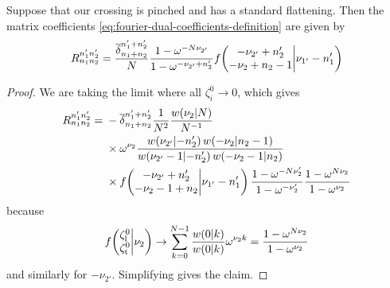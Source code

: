 \documentclass{sl2ams}
\numberwithin{equation}{section}
\begin{document}
\begin{lemma}
  \label{thm:fourier-dual-lemma-pinched}
  Suppose that our crossing is pinched and has a standard flattening.
  Then the matrix coefficients \eqref{eq:fourier-dual-coefficients-definition} are given by 
  \begin{equation}
    \label{eq:fourier-dual-coefficients-pinched}
    R_{n_{1} n_{2}}^{n_{1}' n_{2}'}
    =
    \frac{
      \overline{\delta}_{n_1 + n_2}^{n_1' +  n_2'}
      }{
      N 
    }
    \frac{
      1- \omega^{-N \nu_{2'}}
      }{
      1- \omega^{-\nu_{2'} + n_{2}'}
    }
    f\mathopen{}\left( \begin{matrix} - \nu_{2'} + n_{2}'  \\ - \nu_{2} + n_{2} - 1 \end{matrix}\middle| \nu_{1'} - n_{1}'  \right)
  \end{equation}
\end{lemma}

\begin{proof}
  We are taking the limit where all \(\zeta_{i}^{0} \to 0\), which gives
  \begin{equation*}
    \begin{aligned}
      R_{n_1 n_2}^{n_1' n_2'}
      =
      {}
      &
      -
      \overline{\delta}_{n_1 + n_2}^{n_1' +  n_2'}
      \frac{
        1
      }{
        N^{2}
      }
      \frac{
        w\mathopen{}\left(\nu_{2} \middle | N \right)
      }{
        N^{-1}
      }
      \\
      &\times
      \omega^{\nu_{2} }
      \frac{
        w\mathopen{}\left(\nu_{2'} \middle | -n_2' \right)
        w\mathopen{}\left(-\nu_{2} \middle | n_2 - 1 \right)
      }{
        w\mathopen{}\left(\nu_{2'} - 1 \middle | - n_2' \right)
        w\mathopen{}\left(- \nu_{2} - 1 \middle | n_2  \right)
      }
      \\
      &\times
      f\mathopen{}\left( \begin{matrix} - \nu_{2'} + n_{2}'  \\  - \nu_{2} -1 + n_{2}  \end{matrix}\middle|  \nu_{1'} - n_{1}'  \right)
      \frac{
        1 - \omega^{-N\nu_{2}'}
        }{
        1 - \omega^{-\nu_{2}'}
      }
      \frac{
        1 - \omega^{N\nu_{2}}
        }{
        1 - \omega^{\nu_{2}}
      }
    \end{aligned}
  \end{equation*}
  because 
  \[
    f\mathopen{}\left( \begin{matrix} \zeta_{\mathrm{l}}^0  \\ \zeta_{\mathrm{t}}^0 \end{matrix}\middle| \nu_{2} \right)
    \to
    \sum_{k=0}^{N - 1}
    \frac{
      w\mathopen{}\left(0 \middle | k \right)
      }{
      w\mathopen{}\left(0 \middle | k \right)
    }
    \omega^{\nu_{2} k}
    =
    \frac{
      1 - \omega^{N\nu_{2}}
    }{
      1 - \omega^{\nu_{2}}
    }
  \]
  and similarly for \(-\nu_{2'}\).
  Simplifying gives the claim.
\end{proof}
\end{document}
